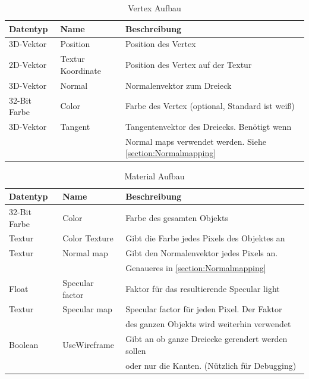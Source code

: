 \begin{table}
	\caption{Vertex Aufbau}
	\label{table:VertexAufbau}
	\centering
	\begin{tabular}{lll}\toprule[1.5pt]
		Datentyp & Name & Beschreibung \\\midrule
		3D-Vektor & Position & Position des Vertex \\
		2D-Vektor & Textur Koordinate & Position des Vertex auf der Textur \\
		3D-Vektor & Normal & Normalenvektor zum Dreieck \\
		32-Bit Farbe & Color & Farbe des Vertex (optional, Standard ist weiß) \\
		3D-Vektor & Tangent & Tangentenvektor des Dreiecks. Benötigt wenn \\
		 & & Normal maps verwendet werden. Siehe \cref{section:Normalmapping}\\\bottomrule[1.5pt]
	\end{tabular}
\end{table}
\begin{table}
	\caption{Material Aufbau}
	\centering
	\begin{tabular}{lll}\toprule[1.5pt]
	Datentyp & Name & Beschreibung \\\midrule
	32-Bit Farbe & Color & Farbe des gesamten Objekts \\
	Textur & Color Texture & Gibt die Farbe jedes Pixels des Objektes an \\
	Textur & Normal map & Gibt den Normalenvektor jedes Pixels an. \\
	 & & Genaueres in \cref{section:Normalmapping} \\
	Float & Specular factor & Faktor für das resultierende Specular light \\
	Textur & Specular map & Specular factor für jeden Pixel. Der Faktor \\
	 & & des ganzen Objekts wird weiterhin verwendet \\
	 Boolean & UseWireframe & Gibt an ob ganze Dreiecke gerendert werden sollen\\
	  & & oder nur die Kanten. (Nützlich für Debugging)\\\bottomrule[1.5pt]
\end{tabular}
\end{table}


